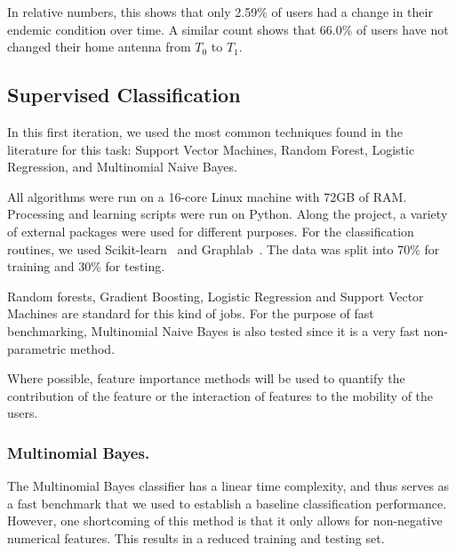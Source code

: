 In relative numbers, this shows that only 2.59\% of users had a change in their endemic condition over time. A similar count shows that 66.0\% of users have not changed their home antenna from $T_0$ to $T_1$.


\subsection{Supervised Classification}


In this first iteration, we used the most common techniques found in the literature for this task:
Support Vector Machines, Random Forest, Logistic Regression, and Multinomial Naive Bayes.

All algorithms were run on a 16-core Linux machine with 72GB of RAM. Processing and learning scripts were run on Python. %
Along the project, a variety of external packages were used for different purposes. For the classification routines, we used Scikit-learn~\textcite{scikit-learn} and Graphlab~\textcite{graphlab}.
The data was split into 70\% for training and 30\% for testing.



Random forests, Gradient Boosting, Logistic Regression and Support Vector Machines are standard for this kind of jobs. For the purpose of fast benchmarking, Multinomial Naive Bayes is also tested since it is a very fast non-parametric method. 

Where possible, feature importance methods will be used to quantify the contribution of the feature or the interaction of features to the mobility of the users.




\subsubsection{Multinomial Bayes.}

The Multinomial Bayes classifier has a linear time complexity, and thus serves as a fast benchmark that we used to establish a baseline classification performance. However, one shortcoming of this method is that it only allows for non-negative numerical features. This results in a reduced training and testing set.

